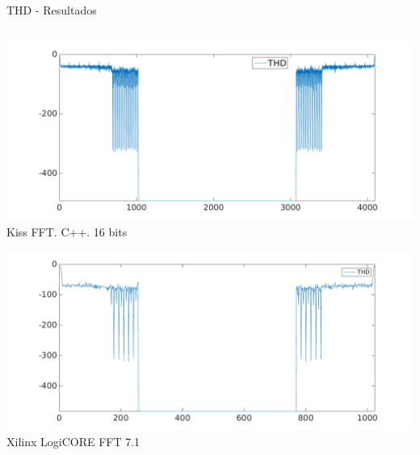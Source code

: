 \begin{frame}{THD - Resultados}
\begin{columns}[T]
\begin{column}{.5\textwidth}
	    
	    \begin{center}
	       \includegraphics[scale=0.17]{./figures/thd_kiss_4096_16.png}\\
	      Kiss FFT. C++. 16 bits
	    \end{center}
	    
	    \begin{center}
	      \includegraphics[scale=0.17]{./figures/thd_xilinx_r4_16_1024.png}\\
	      Xilinx LogiCORE FFT 7.1
	    \end{center}
	    
    \end{column}
  \end{columns}
\end{frame}

